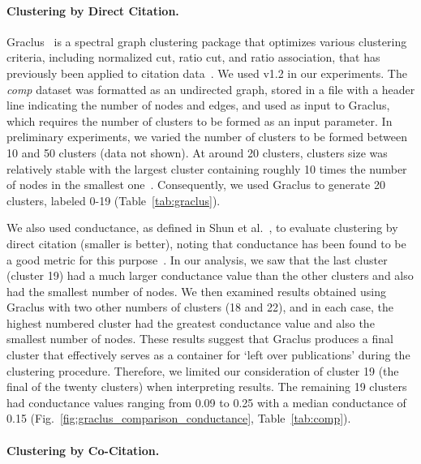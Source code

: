 \paragraph{Clustering by Direct Citation.} Graclus~\cite{graclus_2007} is a spectral graph clustering package that optimizes  various clustering criteria, including normalized cut, ratio cut, and ratio association, that has previously been applied to citation data~\cite{subelj_clustering_2016}. 
We used v1.2 in our experiments. The \emph{comp} dataset was formatted as an undirected graph, stored in a file with a header line indicating the number of nodes and edges, and used as input to Graclus, which requires the number of clusters to be formed as an input parameter. In preliminary experiments, we varied the number of clusters to be formed between 10 and 50 clusters (data not shown).  At around 20 clusters, clusters size was relatively stable with the largest cluster containing roughly 10 times the number of nodes in the smallest one~\cite{subelj_clustering_2016}. Consequently, we used Graclus to generate 20 clusters, labeled 0-19 (Table~\ref{tab:graclus}).

We also used conductance, as defined in Shun et al.~\cite{shun_parallel_2016}, to  evaluate clustering by direct citation (smaller is better), noting that conductance has been found to be a good metric for this purpose~\cite{emmons2016analysis,almeida_2012}. 
In our analysis, we saw that the last cluster (cluster 19) had a much larger conductance value than the other clusters and also had the smallest
number of nodes.
We then examined
results obtained using Graclus with two other numbers of clusters (18 and 22), and
in each case, the highest numbered cluster  had the greatest conductance value and also the smallest number of nodes.
These results suggest that Graclus produces a final cluster that effectively serves as a container for `left over publications' during the clustering procedure. 
Therefore, we limited our consideration of cluster 19 (the final of the twenty clusters)  when interpreting results.  The remaining 19 clusters had conductance values ranging from 0.09 to 0.25 with a median conductance of 0.15 (Fig.~\ref{fig:graclus_comparison_conductance}, Table~\ref{tab:comp}).

\paragraph{Clustering by Co-Citation.}

